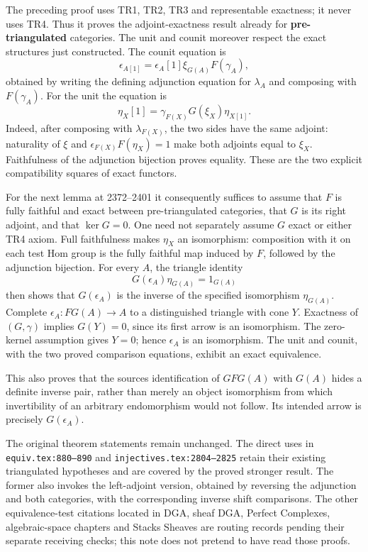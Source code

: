 \documentclass[11pt]{article}
\begin{document}
The preceding proof uses TR1,\allowbreak{} TR2,\allowbreak{} TR3 and representable exactness; it never uses TR4. Thus it proves the adjoint-exactness result already for \textbf{pre-triangulated} categories. The unit and counit moreover respect the exact structures just constructed. The counit equation is \[
\epsilon_{A[1]}=\epsilon_A[1]\xi_{G(A)}F(\gamma_A),
\] obtained by writing the defining adjunction equation for \(\lambda_A\) and composing with \(F(\gamma_A)\). For the unit the equation is \[
\eta_X[1]=\gamma_{F(X)}G(\xi_X)\eta_{X[1]}.
\] Indeed,\allowbreak{} after composing with \(\lambda_{F(X)}\),\allowbreak{} the two sides have the same adjoint:\allowbreak{} naturality of \(\xi\) and \(\epsilon_{F(X)}F(\eta_X)=1\) make both adjoints equal to \(\xi_X\). Faithfulness of the adjunction bijection proves equality. These are the two explicit compatibility squares of exact functors.

For the next lemma at 2372–\allowbreak{}2401 it consequently suffices to assume that \(F\) is fully faithful and exact between pre-triangulated categories,\allowbreak{} that \(G\) is its right adjoint,\allowbreak{} and that \(\ker G=0\). One need not separately assume \(G\) exact or either TR4 axiom. Full faithfulness makes \(\eta_X\) an isomorphism:\allowbreak{} composition with it on each test Hom group is the fully faithful map induced by \(F\),\allowbreak{} followed by the adjunction bijection. For every \(A\),\allowbreak{} the triangle identity \[
G(\epsilon_A)\eta_{G(A)}=1_{G(A)}
\] then shows that \(G(\epsilon_A)\) is the inverse of the specified isomorphism \(\eta_{G(A)}\). Complete \(\epsilon_A:FG(A)\to A\) to a distinguished triangle with cone \(Y\). Exactness of \((G,\gamma)\) implies \(G(Y)=0\),\allowbreak{} since its first arrow is an isomorphism. The zero-kernel assumption gives \(Y=0\); hence \(\epsilon_A\) is an isomorphism. The unit and counit,\allowbreak{} with the two proved comparison equations,\allowbreak{} exhibit an exact equivalence.

This also proves that the source\textquotesingle s identification of \(GFG(A)\) with \(G(A)\) hides a definite inverse pair,\allowbreak{} rather than merely an object isomorphism from which invertibility of an arbitrary endomorphism would not follow. Its intended arrow is precisely \(G(\epsilon_A)\).

The original theorem statements remain unchanged. The direct uses in \texttt{equiv.\allowbreak{}tex:\allowbreak{}880–\allowbreak{}890} and \texttt{injectives.\allowbreak{}tex:\allowbreak{}2804–\allowbreak{}2825} retain their existing triangulated hypotheses and are covered by the proved stronger result. The former also invokes the left-adjoint version,\allowbreak{} obtained by reversing the adjunction and both categories,\allowbreak{} with the corresponding inverse shift comparisons. The other equivalence-test citations located in DGA,\allowbreak{} sheaf DGA,\allowbreak{} Perfect Complexes,\allowbreak{} algebraic-space chapters and Stacks Sheaves are routing records pending their separate receiving checks; this note does not pretend to have read those proofs.
\clearpage
\end{document}
